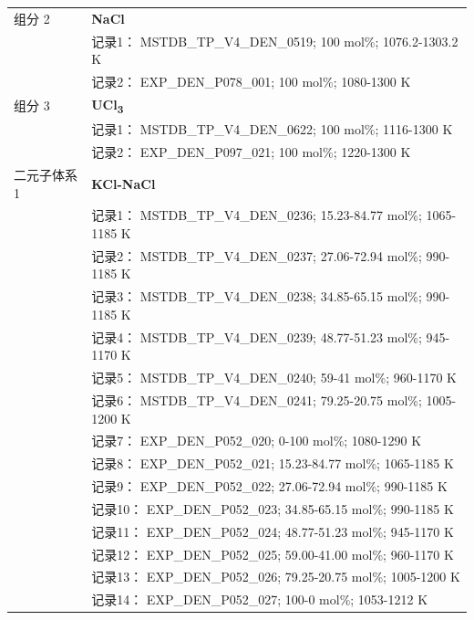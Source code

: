 \documentclass[12pt]{article}
\begin{document}
{\begin{longtable}[]{@{}
  >{\raggedright\arraybackslash}p{}
  >{\raggedright\arraybackslash}p{}@{}}
组分 2  & \textbf{NaCl} \\
 & 记录1： MSTDB\_TP\_V4\_DEN\_0519; 100 mol\%; 1076.2-1303.2 K \\
 & 记录2： EXP\_DEN\_P078\_001; 100 mol\%; 1080-1300 K  \\

组分 3  & \textbf{UCl\textsubscript{3}} \\
 & 记录1： MSTDB\_TP\_V4\_DEN\_0622; 100 mol\%; 1116-1300 K \\
 & 记录2： EXP\_DEN\_P097\_021; 100 mol\%; 1220-1300 K  \\

二元子体系 1  & \textbf{KCl-NaCl} \\
 & 记录1： MSTDB\_TP\_V4\_DEN\_0236; 15.23-84.77 mol\%; 1065-1185 K \\
 & 记录2： MSTDB\_TP\_V4\_DEN\_0237; 27.06-72.94 mol\%; 990-1185 K \\
 & 记录3： MSTDB\_TP\_V4\_DEN\_0238; 34.85-65.15 mol\%; 990-1185 K \\
 & 记录4： MSTDB\_TP\_V4\_DEN\_0239; 48.77-51.23 mol\%; 945-1170 K \\
 & 记录5： MSTDB\_TP\_V4\_DEN\_0240; 59-41 mol\%; 960-1170 K \\
 & 记录6： MSTDB\_TP\_V4\_DEN\_0241; 79.25-20.75 mol\%; 1005-1200 K \\
 & 记录7： EXP\_DEN\_P052\_020; 0-100 mol\%; 1080-1290 K \\
 & 记录8： EXP\_DEN\_P052\_021; 15.23-84.77 mol\%; 1065-1185 K \\
 & 记录9： EXP\_DEN\_P052\_022; 27.06-72.94 mol\%; 990-1185 K \\
 & 记录10： EXP\_DEN\_P052\_023; 34.85-65.15 mol\%; 990-1185 K \\
 & 记录11： EXP\_DEN\_P052\_024; 48.77-51.23 mol\%; 945-1170 K \\
 & 记录12： EXP\_DEN\_P052\_025; 59.00-41.00 mol\%; 960-1170 K \\
 & 记录13： EXP\_DEN\_P052\_026; 79.25-20.75 mol\%; 1005-1200 K \\
 & 记录14： EXP\_DEN\_P052\_027; 100-0 mol\%; 1053-1212 K  \\


\end{longtable}}
\end{document}
